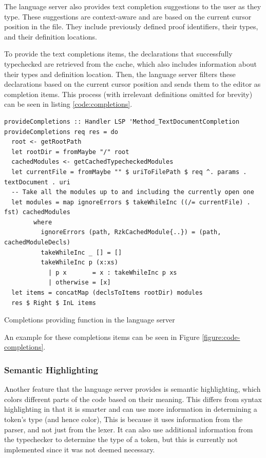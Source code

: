The language server also provides text completion suggestions to the user as they type.
These suggestions are context-aware and are based on the current cursor position in the file.
They include previously defined proof identifiers, their types, and their definition locations.

To provide the text completions items, the declarations that successfully typechecked are
retrieved from the cache, which also includes information about their types and definition location.
Then, the language server filters these declarations based on the current cursor position
and sends them to the editor as completion items.
This process (with irrelevant definitions omitted for brevity) can be seen in listing \ref{code:completions}.

\begin{listing}
  \begin{verbatim}
provideCompletions :: Handler LSP 'Method_TextDocumentCompletion
provideCompletions req res = do
  root <- getRootPath
  let rootDir = fromMaybe "/" root
  cachedModules <- getCachedTypecheckedModules
  let currentFile = fromMaybe "" $ uriToFilePath $ req ^. params . textDocument . uri
  -- Take all the modules up to and including the currently open one
  let modules = map ignoreErrors $ takeWhileInc ((/= currentFile) . fst) cachedModules
        where
          ignoreErrors (path, RzkCachedModule{..}) = (path, cachedModuleDecls)
          takeWhileInc _ [] = []
          takeWhileInc p (x:xs)
            | p x       = x : takeWhileInc p xs
            | otherwise = [x]
  let items = concatMap (declsToItems rootDir) modules
  res $ Right $ InL items
  \end{verbatim}
  \caption{Completions providing function in the language server}
  \label{code:completions}
\end{listing}

An example for these completions items can be seen in Figure \ref{figure:code-completions}.

\subsubsection{Semantic Highlighting}

Another feature that the language server provides is semantic highlighting, which colors different parts of the code
based on their meaning.
This differs from syntax highlighting in that it is smarter and can use more information in determining a token's type (and hence color),
This is because it uses information from the parser, and not just from the lexer.
It can also use additional information from the typechecker to determine the type of a token,
but this is currently not implemented since it was not deemed necessary.

